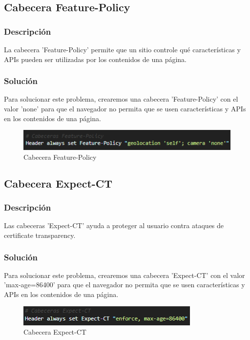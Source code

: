 \documentclass{report}
\begin{document}
            \subsection{Cabecera Feature-Policy}
                \subsubsection{Descripción}
                    La cabecera 'Feature-Policy' permite que un sitio controle qué características y APIs pueden ser utilizadas por los contenidos de una página.
                \subsubsection{Solución}
                    Para solucionar este problema, crearemos una cabecera 'Feature-Policy' con el valor 'none' para que el navegador no permita que se usen características y APIs en los contenidos de una página.
                    \begin{figure}[H]
                        \centering
                        \includegraphics[width=\textwidth]{./img/vulnerabilidades/3.5/12.1.png}
                        \caption{Cabecera Feature-Policy}
                    \end{figure}
            \clearpage
            \subsection{Cabecera Expect-CT}
                \subsubsection{Descripción}
                    Las cabeceras 'Expect-CT' ayuda a proteger al usuario contra ataques de certificate transparency.
                \subsubsection{Solución}
                    Para solucionar este problema, crearemos una cabecera 'Expect-CT' con el valor 'max-age=86400' para que el navegador no permita que se usen características y APIs en los contenidos de una página.
                    \begin{figure}[H]
                        \centering
                        \includegraphics[width=\textwidth]{./img/vulnerabilidades/3.5/13.1.png}
                        \caption{Cabecera Expect-CT}
                    \end{figure}
            \clearpage
\end{document}
